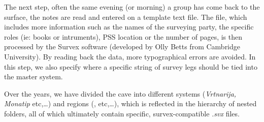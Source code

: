 The next step, often the same evening (or morning) a group has come back to the surface, the notes are read and entered on a template text file. The file, which includes more information such as the names of the surveying party, the specific roles (ie: books or intruments), PSS location or the number of pages, is then processed by the Survex software (developed by Olly Betts from Cambridge University). By reading back the data, more typographical errors are avoided. In this step, we also specify where a specific string of survey legs should be tied into the master system. 

Over the years, we have divided the cave into different systems (\emph{Vrtnarija, Monatip} etc,…)  and regions (,  etc,…), which is reflected in the hierarchy of nested folders, all of which ultimately contain specific, survex-compatible \emph{.svx} files.


 \begin{figure}[t!]
 \checkoddpage \ifoddpage \forcerectofloat \else \forceversofloat \fi
 \centering
\end{figure}


%
%




